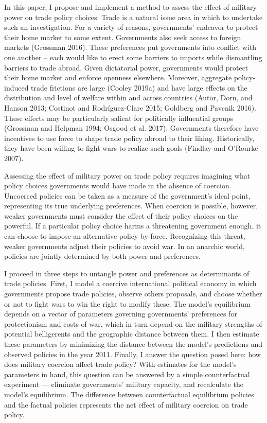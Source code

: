 \documentclass{puthesis}
\begin{document}
In this paper, I propose and implement a method to assess the effect of
military power on trade policy choices. Trade is a natural issue area in
which to undertake such an investigation. For a variety of reasons,
governments' endeavor to protect their home market to some extent.
Governments also seek access to foreign markets (Grossman 2016). These
preferences put governments into conflict with one another -- each would
like to erect some barriers to imports while dismantling barriers to
trade abroad. Given dictatorial power, governments would protect their
home market and enforce openness elsewhere. Moreover, aggregate
policy-induced trade frictions are large (Cooley 2019a) and have large
effects on the distribution and level of welfare within and across
countries (Autor, Dorn, and Hanson 2013; Costinot and Rodríguez-Clare
2015; Goldberg and Pavcnik 2016). These effects may be particularly
salient for politically influential groups (Grossman and Helpman 1994;
Osgood et al. 2017). Governments therefore have incentives to use force
to shape trade policy abroad to their liking. Historically, they have
been willing to fight wars to realize such goals (Findlay and O'Rourke
2007).

Assessing the effect of military power on trade policy requires
imagining what policy choices governments would have made in the absence
of coercion. Uncoerced policies can be taken as a measure of the
government's ideal point, representing its true underlying preferences.
When coercion is possible, however, weaker governments must consider the
effect of their policy choices on the powerful. If a particular policy
choice harms a threatening government enough, it can choose to impose an
alternative policy by force. Recognizing this threat, weaker governments
adjust their policies to avoid war. In an anarchic world, policies are
jointly determined by both power and preferences.

I proceed in three steps to untangle power and preferences as
determinants of trade policies. First, I model a coercive international
political economy in which governments propose trade policies, observe
others proposals, and choose whether or not to fight wars to win the
right to modify these. The model's equilibrium depends on a vector of
parameters governing governments' preferences for protectionism and
costs of war, which in turn depend on the military strengths of
potential belligerents and the geographic distance between them. I then
estimate these parameters by minimizing the distance between the model's
predictions and observed policies in the year 2011. Finally, I answer
the question posed here: how does military coercion affect trade policy?
With estimates for the model's parameters in hand, this question can be
answered by a simple counterfactual experiment --- eliminate
governments' military capacity, and recalculate the model's equilibrium.
The difference between counterfactual equilibrium policies and the
factual policies represents the net effect of military coercion on trade
policy.
\end{document}
